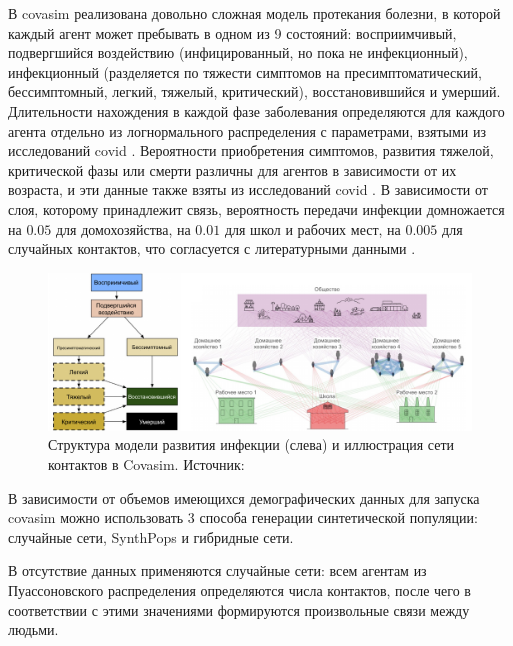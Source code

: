 \documentclass[a4paper,12pt]{article} %
\begin{document}
В \gls{covasim} реализована довольно сложная модель протекания болезни, в которой каждый агент может пребывать в одном из 9 состояний: восприимчивый, подвергшийся воздействию (инфицированный, но пока не инфекционный), инфекционный (разделяется по тяжести симптомов на пресимптоматический, бессимптомный, легкий, тяжелый, критический), восстановившийся и умерший. Длительности нахождения в каждой фазе заболевания определяются для каждого агента отдельно из логнормального распределения с параметрами, взятыми из исследований \gls{covid} \cite{lauer2020incubation, du2020serial, nishiura2020serial, pung2020investigation, linton2020incubation, he2020temporal, wang2020clinical, chen2020clinical, verity2020estimates, wolfel2020virological}. Вероятности приобретения симптомов, развития тяжелой, критической фазы или смерти различны для агентов в зависимости от их возраста, и эти данные также взяты из исследований \gls{covid} \cite{chen2020clinical, wolfel2020virological, o2021age, baguelin2020report, ferguson2020impact}. В зависимости от слоя, которому принадлежит связь, вероятность передачи инфекции домножается на $0.05$ для домохозяйства, на $0.01$ для школ и рабочих мест, на $0.005$ для случайных контактов, что согласуется с литературными данными \cite{zhang2020changes, lader2006time}.

\begin{figure}[]
    \centering
    \includegraphics[width=\linewidth]{images/covasim.pdf}
    \caption{Структура модели развития инфекции (слева) и иллюстрация сети контактов в Covasim. Источник: \cite{kerr2021covasim}}
\end{figure}

В зависимости от объемов имеющихся демографических данных для запуска \gls{covasim} можно использовать 3 способа генерации синтетической популяции: случайные сети, SynthPops и гибридные сети.

В отсутствие данных применяются случайные сети: всем агентам из Пуассоновского распределения определяются числа контактов, после чего в соответствии с этими значениями формируются произвольные связи между людьми.
\end{document}
